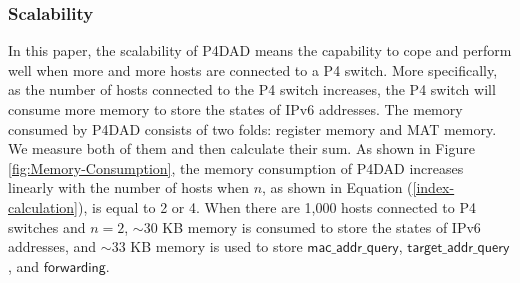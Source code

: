 \documentclass[a4paper,fleqn]{cas-dc}
\begin{document}
        \subsubsection{Scalability}\label{sec:scalability}
            In this paper, the scalability of P4DAD means the capability to cope and perform well when more and more hosts are connected to a P4 switch. More specifically, as the number of hosts connected to the P4 switch increases, the P4 switch will consume more memory to store the states of IPv6 addresses.
            The memory consumed by P4DAD consists of two folds: register memory and MAT memory. 
            We measure both of them and then calculate their sum.
            As shown in Figure \ref{fig:Memory-Consumption}, the memory consumption of P4DAD increases linearly with the number of hosts when $n$, as shown in Equation (\ref{index-calculation}), is equal to 2 or 4. When there are 1,000 hosts connected to P4 switches and $n=2$, $\sim$30 KB memory is consumed to store the states of IPv6 addresses, and $\sim$33 KB memory is used to store $\mathsf{mac\_addr\_query}$, $\mathsf{target\_addr\_query}$, and $\mathsf{forwarding}$.
            
\end{document}
